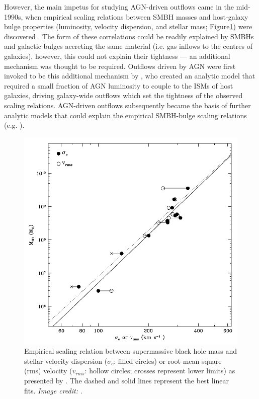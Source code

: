 However, the main impetus for studying AGN-driven outflows came in the mid-1990s, when empirical scaling relations between SMBH masses and host-galaxy bulge properties (luminosity, velocity dispersion, and stellar mass; Figure\;\ref{fig: introduction: historical_context: galaxy_evolution: ferrarese2000_mbh_vdisp}) were discovered \citep{Kormendy1995, Magorrian1998, Gebhardt2000, Ferrarese2000}. The form of these correlations could be readily explained by SMBHs and galactic bulges accreting the same material (i.e. gas inflows to the centres of galaxies), however, this could not explain their tightness --- an additional mechanism was thought to be required. Outflows driven by AGN were first invoked to be this additional mechanism by \citet{Silk1998}, who created an analytic model that required a small fraction of AGN luminosity to couple to the ISMs of host galaxies, driving galaxy-wide outflows which set the tightness of the observed scaling relations. AGN-driven outflows subsequently became the basis of further analytic models that could explain the empirical SMBH-bulge scaling relations (e.g. \citealt{Fabian1999, King2003}).

\begin{figure}
    \centering
    \includegraphics[width=0.9\linewidth]{figures/introduction/ferrarese2000_mbh_vdisp.png}
    \caption[Empirical scaling relation between supermassive black hole mass and galactic bulge stellar velocity dispersion, presented by \citet{Ferrarese2000}.]{Empirical scaling relation between supermassive black hole mass and stellar velocity dispersion ($\sigma_c$: filled circles) or root-mean-square (rms) velocity ($v_{rms}$: hollow circles; crosses represent lower limits) as presented by \citet{Ferrarese2000}. The dashed and solid lines represent the best linear fits. \textit{Image credit: \citet{Ferrarese2000}}.}
    \label{fig: introduction: historical_context: galaxy_evolution: ferrarese2000_mbh_vdisp}
\end{figure}

